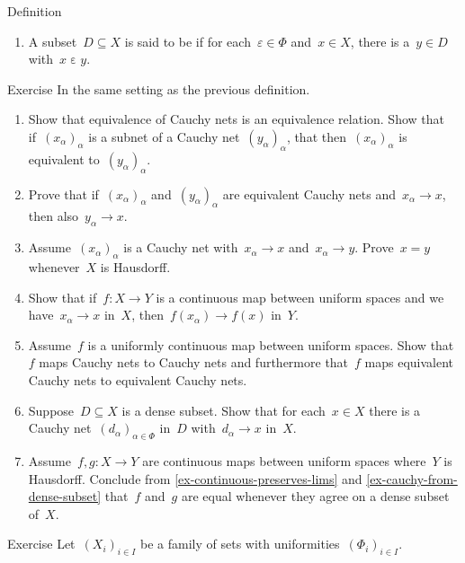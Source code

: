 \begin{parsec}
\begin{point}{Definition}
\begin{enumerate}
\item
    A subset~$D \subseteq X$ is said to be 
    if for each~$\varepsilon \in \Phi$ and~$x \in X$,
    there is a~$y \in D$
    with~$x \mathrel\varepsilon y$.
\end{enumerate}
\end{point}
\begin{point}{Exercise}%
    In the same setting as the previous definition.
    \begin{enumerate}
\item
    Show that equivalence of Cauchy nets is an equivalence relation.
    Show that if~$(x_\alpha)_\alpha$ is a subnet of
    a Cauchy net~$(y_\alpha)_\alpha$,
        that then~$(x_\alpha)_\alpha$ is equivalent to~$(y_\alpha)_\alpha$.
\item
    Prove that if~$(x_\alpha)_\alpha$ and~$(y_\alpha)_\alpha$
        are equivalent Cauchy nets and~$x_\alpha \to x$,
        then also~$y_\alpha \to x$.
\item
    Assume~$(x_\alpha)_\alpha$ is a Cauchy net with~$x_\alpha \to x$
        and~$x_\alpha \to y$.  Prove~$x = y$ whenever~$X$ is Hausdorff.
\item\label{ex-continuous-preserves-lims}
    Show that if~$f\colon X \to Y$ is a continuous map
    between uniform spaces
        and we have~$x_\alpha \to x$ in~$X$,
        then~$f(x_\alpha) \to f(x)$ in~$Y$.
\item
    Assume~$f$ is a uniformly continuous map between uniform spaces.
    Show that $f$ maps Cauchy nets to Cauchy nets
    and furthermore that~$f$ maps equivalent Cauchy nets to equivalent
        Cauchy nets.
\item\label{ex-cauchy-from-dense-subset}
    Suppose~$D \subseteq X$ is a dense subset.
    Show that for each~$x \in X$
    there is a Cauchy net~$(d_\alpha)_{\alpha \in \Phi}$
    in~$D$ with~$d_\alpha \to x$ in~$X$.
\item
    Assume~$f,g\colon X \to Y$ are continuous maps between uniform spaces
        where~$Y$ is Hausdorff.
Conclude from \ref{ex-continuous-preserves-lims} and
    \ref{ex-cauchy-from-dense-subset}
    that~$f$ and~$g$ are equal whenever they agree on a dense subset of~$X$.
    \end{enumerate}
\end{point}
\begin{point}{Exercise}%
    Let~$(X_i)_{i \in I}$ be a family of sets with
        uniformities~$(\Phi_i)_{i \in I}$.

\end{point}
\end{parsec}
